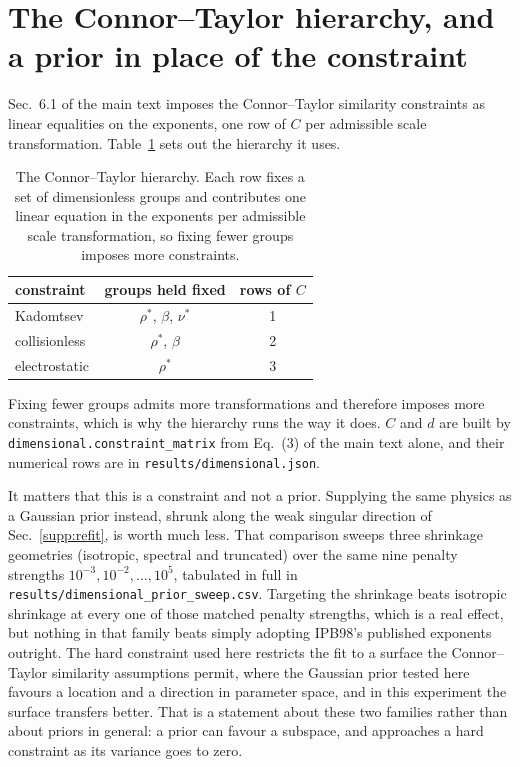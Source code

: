 \documentclass[12pt,letterpaper]{article}
\begin{document}
\section{The Connor--Taylor hierarchy, and a prior in place of the constraint}
\label{supp:hierarchy}

Sec.~6.1 of the main text imposes the Connor--Taylor similarity constraints as
linear equalities on the exponents, one row of $C$ per admissible scale
transformation. Table~\ref{tab:hierarchy} sets out the hierarchy it uses.

\begin{table}[!ht]
\centering
\small
\caption{The Connor--Taylor hierarchy. Each row fixes a set of dimensionless
groups and contributes one linear equation in the exponents per admissible
scale transformation, so fixing fewer groups imposes more constraints.}
\label{tab:hierarchy}
\begin{tabular}{lcc}
\toprule
constraint & groups held fixed & rows of $C$ \\
\midrule
Kadomtsev~\cite{kadomtsev} & $\rho^{*}$, $\beta$, $\nu^{*}$ & 1 \\
collisionless & $\rho^{*}$, $\beta$ & 2 \\
electrostatic & $\rho^{*}$ & 3 \\
\bottomrule
\end{tabular}
\par\smallskip{}
\end{table}

\noindent Fixing fewer groups admits more transformations and therefore imposes
more constraints, which is why the hierarchy runs the way it does. $C$ and $d$
are built by \texttt{dimensional.constraint\_matrix} from
Eq.~(3) of the main text alone, and their numerical rows are in
\texttt{results/dimensional.json}.

It matters that this is a constraint and not a prior. Supplying the same physics
as a Gaussian prior instead, shrunk along the weak singular direction of
Sec.~\ref{supp:refit}, is worth much less. That comparison sweeps three
shrinkage geometries (isotropic, spectral and truncated) over the same nine
penalty strengths $10^{-3}, 10^{-2}, \dots, 10^{5}$, tabulated in full in
\texttt{results/dimensional\_prior\_sweep.csv}. Targeting the shrinkage beats
isotropic shrinkage at every one of those matched penalty strengths, which is a
real effect, but nothing in that family beats simply adopting IPB98's published
exponents outright. The hard
constraint used here restricts the fit to a surface the Connor--Taylor
similarity assumptions permit, where
the Gaussian prior tested here favours a location and a direction in parameter
space, and in this experiment the surface transfers better. That is a statement
about these two families rather than about priors in general: a prior can favour
a subspace, and approaches a hard constraint as its variance goes to zero.
\end{document}
